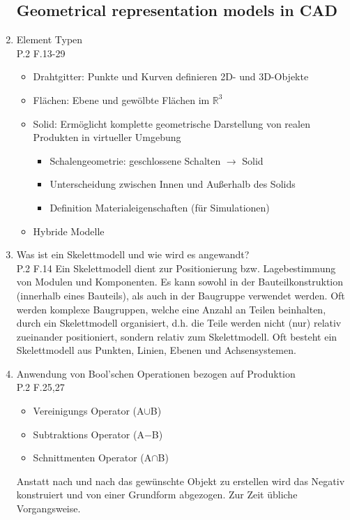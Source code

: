 \documentclass[10pt,a4paper,fleqn]{article}
\begin{document}
\begin{enumerate}
\subsection{Geometrical representation models in CAD}
	\item Element Typen\\
		P.2 F.13-29
	 	\begin{itemize}
	 		\item Drahtgitter: Punkte und Kurven definieren 2D- und 3D-Objekte
	 		\item Flächen: Ebene und gewölbte Flächen im $\mathbb{R}^3$
	 		\item Solid: Ermöglicht komplette geometrische Darstellung von realen Produkten in virtueller Umgebung
	 			\begin{itemize}
	 				\item Schalengeometrie: geschlossene Schalten $\rightarrow$ Solid
	 				\item Unterscheidung zwischen Innen und Außerhalb des Solids
	 				\item Definition Materialeigenschaften (für Simulationen)	 			
	 			\end{itemize}
	 		\item Hybride Modelle
	 	\end{itemize}
	 \item Was ist ein Skelettmodell und wie wird es angewandt?\\
	 	P.2 F.14
	 	Ein Skelettmodell dient zur Positionierung bzw. Lagebestimmung von Modulen und Komponenten. Es kann sowohl in der Bauteilkonstruktion (innerhalb eines Bauteils), als auch in der Baugruppe verwendet werden. Oft werden komplexe Baugruppen, welche eine Anzahl an Teilen beinhalten, durch ein Skelettmodell organisiert, d.h. die Teile werden nicht (nur) relativ zueinander positioniert, sondern relativ zum Skelettmodell. Oft besteht ein Skelettmodell aus Punkten, Linien, Ebenen und Achsensystemen. 
	 \item Anwendung von Bool'schen Operationen bezogen auf Produktion\\
	 	P.2 F.25,27
	 	\begin{itemize}
	 		\item Vereinigungs Operator (A$\cup$B)
	 		\item Subtraktions Operator (A$ - $B)
	 		\item Schnittmenten Operator (A$\cap$B)
	 	\end{itemize}
	 	Anstatt nach und nach das gewünschte Objekt zu erstellen wird das Negativ konstruiert und von einer Grundform abgezogen. Zur Zeit übliche Vorgangsweise.
	

\end{enumerate}
\end{document}
